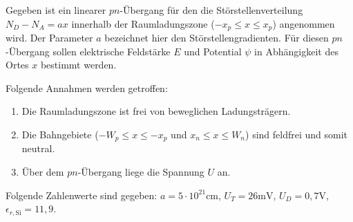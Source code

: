 \documentclass{article}
\begin{document}
\begin{exercise}
Gegeben ist ein linearer $pn$-Übergang für den die Störstellenverteilung $N_D-N_A=ax$ innerhalb der Raumladungszone ($-x_p\leq x\leq x_p$) angenommen wird. Der Parameter $a$ bezeichnet hier den Störstellengradienten.
Für diesen $pn$-Übergang sollen elektrische Feldstärke $E$ und Potential $\psi$ in Abhängigkeit des Ortes $x$ bestimmt werden.

Folgende Annahmen werden getroffen:
\begin{enumerate}
        \item Die Raumladungszone ist frei von beweglichen Ladungsträgern.
        \item Die Bahngebiete ($-W_p\leq x\leq -x_p$ und $x_n\leq x\leq W_n$) sind feldfrei und somit neutral.
        \item Über dem $pn$-Übergang liege die Spannung $U$ an.
\end{enumerate}

Folgende Zahlenwerte sind gegeben: $a=5\cdot 10^{21}\mathrm{cm}$, $U_T=26\mathrm{mV}$, $U_D=0,7\mathrm{V}$, $\epsilon_{r,\mathrm{Si}}=11,9$.
\end{exercise}
\end{document}
